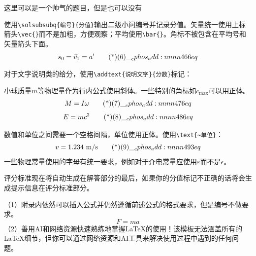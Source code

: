 \documentclass[answer]{cphos}
\begin{document}
\begin{problem}[40]{这里可以是一个帅气的题目，但是也可以没有}
\begin{solution}
使用\texttt{\textbackslash solsubsubq\{编号\}\{分值\}}输出二级小问编号并记录分值。矢量统一使用上标箭头\texttt{\textbackslash vec\{\}}而不是加粗，方便观察；平均使用\texttt{\textbackslash bar\{\}}。角标不被包含在平均号和矢量箭头下面。
\begin{equation}
    \bar{s}_0 = \vec{v}_1 = a' \eqtagscore{6}{6} \label{eq:2.1.1}
\end{equation}

对于文字说明类的给分，使用\texttt{\textbackslash addtext\{说明文字\}\{分数\}}标记：

小球质量$m$等物理量作为行内公式使用斜体。一些特别的角标如$c_{\max}$可以用正体。
\begin{equation}
    M = I\omega \eqtagscore{7}{6}
\end{equation}
\begin{equation}
    E = mc^2 \eqtagscore{8}{6}
\end{equation}

数值和单位之间需要一个空格间隔，单位使用正体。使用\texttt{\textbackslash text\{\textasciitilde 单位\}}：
\begin{equation}
    v = 1.234 \text{~m/s} \eqtagscore{9}{3}
\end{equation}
一些物理常量使用的字母有统一要求，例如对于介电常量应使用$\varepsilon$而不是$\epsilon$。

评分标准现在将自动生成在解答部分的最后，如果你的分值标记不正确的话将会生成提示信息在评分标准部分。

\begin{problemreferences}
\end{problemreferences}

\scoring  %
\end{solution}

\begin{problemappendix}
\noindent（1）附录内依然可以插入公式并仍然遵循前述公式的格式要求，但是编号不做要求。
\begin{equation*}
    F = ma
\end{equation*}
\noindent（2）善用AI和网络资源快速熟练地掌握\LaTeX 的使用！该模板无法涵盖所有的\LaTeX 细节，但你可以通过网络资源和AI工具来解决使用过程中遇到的任何问题。
\end{problemappendix}

\end{problem}
\end{document}
